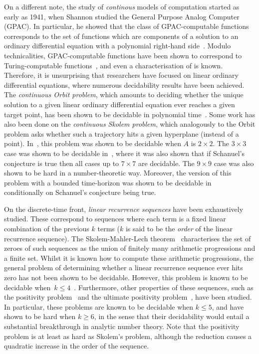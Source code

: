 On a different note, the study of \emph{continous} models of computation started as early as 1941, when Shannon studied the General Purpose Analog Computer (GPAC).
In particular, he showed that the class of GPAC-computable functions corresponds to the set of functions which are components of a solution to an ordinary differential equation with a polynomial right-hand side~\cite{Shannon1941}.
Modulo technicalities, GPAC-computable functions have been shown to correspond to Turing-computable functions~\cite{Bournez1,Bournez2}, and even a characterisation of \PTIME{} is known.
Therefore, it is unsurprising that researchers have focused on linear ordinary differential equations, where numerous decidability results have been achieved.
The \emph{continuous Orbit problem}, which amounts to deciding whether the unique solution to a given linear ordinary differential equation ever reaches a given target point, has been shown to be decidable in polynomial time~\cite{Hainry08,ContinuousOrbitIPL}.
Some work has also been done on the \emph{continuous Skolem problem}, which analogously to the Orbit problem asks whether such a trajectory hits a given hyperplane (instead of a point).
In~\cite{ContinuousSkolem}, this problem was shown to be decidable when $A$ is $2 \times 2$. The $3 \times 3$ case was shown to be decidable in~\cite{VCthesis}, where it was also shown that if Schanuel's conjecture is true then all cases up to $7 \times 7$ are decidable. The $9 \times 9$ case was also shown to be hard in a number-theoretic way.
Moreover, the version of this problem with a bounded time-horizon was shown to be decidable in~\cite{ContinuousSkolem3} conditionally on Schanuel's conjecture being true.

On the discrete-time front, \emph{linear recurrence sequences} have been exhaustively studied. These correspond to sequences where each term is a fixed linear combination of the previous $k$ terms ($k$ is said to be the \emph{order} of the linear recurrence sequence). The Skolem-Mahler-Lech theorem~\cite{Sko34,Mah35,Lec53,Hansel85} characterises the set of zeroes of such sequences as the union of finitely many arithmetic progressions and a finite set. Whilst it is known how to compute these arithmetic progressions\cite{BM76}, the general problem of determining whether a linear recurrence sequence ever hits zero has not been shown to be decidable. However, this problem is known to be decidable when~$k \leq 4$~\cite{Ver85}.
Furthermore, other properties of these sequences, such as the positivity problem~\cite{BG07,HHH06,LT09,OW13:constructive-positivity,OW14:SODA,Liu10} and the ultimate positivity problem~\cite{OuaknineW13b}, have been studied.
In particular, these problems are known to be decidable when $k \leq 5$, and have shown to be hard when $k \geq 6$, in the sense that their decidability would entail a substantial breakthrough in analytic number theory. Note that the positivity problem is at least as hard as Skolem's problem, although the reduction causes a quadratic increase in the order of the sequence.

